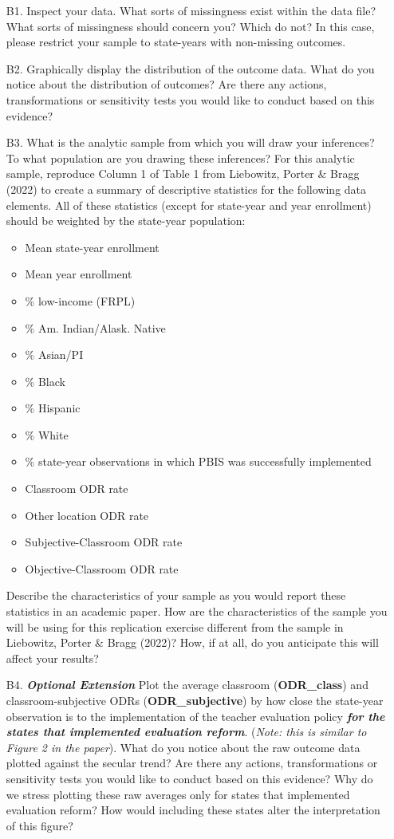 \documentclass[a4paper, 11pt]{article}
\begin{document}
\begin{enumerate}
	\item[B1.] Inspect your data. What sorts of missingness exist within the data file? What sorts of missingness should concern you? Which do not? In this case, please restrict your sample to state-years with non-missing outcomes.
	\item[B2.] Graphically display the distribution of the outcome data. What do you notice about the distribution of outcomes? Are there any actions, transformations or sensitivity tests you would like to conduct based on this evidence?
	\item[B3.] What is the analytic sample from which you will draw your inferences? To what population are you drawing these inferences? For this analytic sample, reproduce Column 1 of Table 1 from Liebowitz, Porter \& Bragg (2022) to create a summary of descriptive statistics for the following data elements. All of these statistics (except for state-year and year enrollment) should be weighted by the state-year population:

	\begin{itemize} 
		\item Mean state-year enrollment 
		\item Mean year enrollment
		\item \% low-income (FRPL)
		\item \% Am. Indian/Alask. Native
		\item \% Asian/PI
		\item \% Black
		\item \% Hispanic
		\item \% White
		\item \% state-year observations in which PBIS was successfully implemented
		\item Classroom ODR rate
		\item Other location ODR rate
		\item Subjective-Classroom ODR rate
		\item Objective-Classroom ODR rate
\end{itemize}

Describe the characteristics of your sample as you would report these statistics in an academic paper. How are the characteristics of the sample you will be using for this replication exercise different from the sample in Liebowitz, Porter \& Bragg (2022)? How, if at all, do you anticipate this will affect your results?
	\item[B4.] \textbf{\textit{Optional Extension}} Plot the average classroom (\textbf{ODR\_class}) and classroom-subjective ODRs (\textbf{ODR\_subjective}) by how close the state-year observation is to the implementation of the teacher evaluation policy \textbf{\textit{for the states that implemented evaluation reform}}. (\textit{Note: this is similar to Figure 2 in the paper}). What do you notice about the raw outcome data plotted against the secular trend? Are there any actions, transformations or sensitivity tests you would like to conduct based on this evidence? Why do we stress plotting these raw averages only for states that implemented evaluation reform? How would including these states alter the interpretation of this figure?


\end{enumerate}
\end{document}
